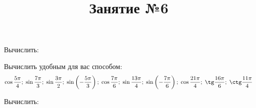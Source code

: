 \begin{listofex}
	\item Вычислить:
	\begin{enumcols}[itemcolumns=3]
		\item {}
		\item {}
		\item {}
		\item {}
		\item {}
	\end{enumcols}
	\item Вычислить удобным для вас способом:
	\[ \cos\dfrac{5\pi}{4};\;\sin\dfrac{7\pi}{3};\;\sin\dfrac{3\pi}{2};\;\sin\left( -\dfrac{5\pi}{3} \right);\;\cos\dfrac{7\pi}{6};\;\sin\dfrac{13\pi}{4};\;\sin\left( -\dfrac{7\pi}{6}  \right);\;\cos\dfrac{21\pi}{4};\;\tg\dfrac{16\pi}{6};\;\ctg\dfrac{11\pi}{4} \]
	\item Вычислить:
	\begin{enumcols}[itemcolumns=2]
		\item {}
		\item {}
	\end{enumcols}
\end{listofex}
\newpage
\title{Занятие №6}
